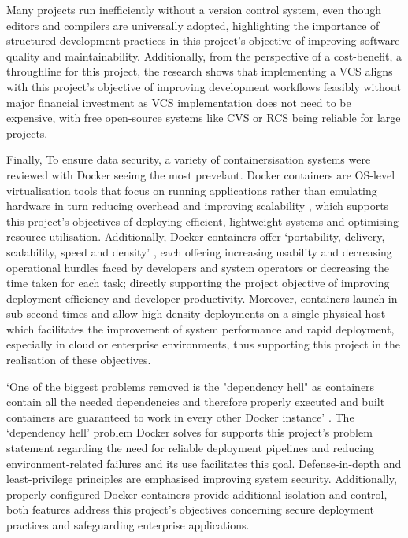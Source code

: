 \documentclass{report}
\begin{document}
Many projects run inefficiently without a version control system, even though editors and compilers are universally adopted, highlighting the importance of structured development practices in this project's objective of improving software quality and maintainability. 
Additionally, from the perspective of a cost-benefit, a throughline for this project, the research shows that implementing a VCS aligns with this project's objective of improving development workflows feasibly without major financial investment as VCS implementation does not need to be expensive, with free open-source systems like CVS or RCS being reliable for large projects.

Finally, To ensure data security, a variety of containersisation systems were reviewed with Docker seeimg the most prevelant. Docker containers are OS-level virtualisation tools that focus on running applications rather than emulating hardware in turn reducing overhead and improving scalability \parencite{vaseAdvantagesDocker2015}, which supports this project's objectives of deploying efficient, lightweight systems and optimising resource utilisation. 
Additionally, Docker containers offer `portability, delivery, scalability, speed and density' \parencite{vaseAdvantagesDocker2015}, each offering increasing usability and decreasing operational hurdles faced by developers and system operators or decreasing the time taken for each task; directly supporting the project objective of improving deployment efficiency and developer productivity. 
Moreover, containers launch in sub-second times and allow high-density deployments on a single physical host \parencite{vaseAdvantagesDocker2015} which facilitates the improvement of system performance and rapid deployment, especially in cloud or enterprise environments, thus supporting this project in the realisation of these objectives.

`One of the biggest problems removed is the "dependency hell" as containers contain all the needed dependencies and therefore properly executed and built containers are guaranteed to work in every other Docker instance' \parencite{vaseAdvantagesDocker2015}. 
The `dependency hell' problem Docker solves for supports this project's problem statement regarding the need for reliable deployment pipelines and reducing environment-related failures and its use facilitates this goal. 
Defense-in-depth and least-privilege principles are emphasised improving system security. 
Additionally, properly configured Docker containers provide additional isolation and control, both features address this project's objectives concerning secure deployment practices and safeguarding enterprise applications.
\end{document}
